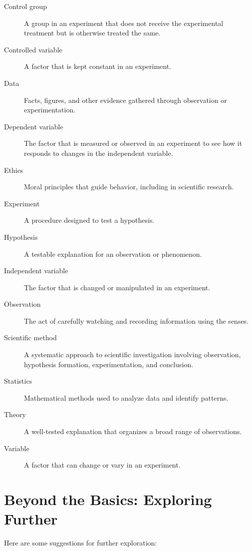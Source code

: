 \begin{description}
    \item[Control group] A group in an experiment that does not receive the experimental treatment but is otherwise treated the same.
    \item[Controlled variable] A factor that is kept constant in an experiment.
    \item[Data] Facts, figures, and other evidence gathered through observation or experimentation.
    \item[Dependent variable] The factor that is measured or observed in an experiment to see how it responds to changes in the independent variable.
    \item[Ethics] Moral principles that guide behavior, including in scientific research.
    \item[Experiment] A procedure designed to test a hypothesis.
    \item[Hypothesis] A testable explanation for an observation or phenomenon.
    \item[Independent variable] The factor that is changed or manipulated in an experiment.
    \item[Observation] The act of carefully watching and recording information using the senses.
    \item[Scientific method] A systematic approach to scientific investigation involving observation, hypothesis formation, experimentation, and conclusion.
    \item[Statistics] Mathematical methods used to analyze data and identify patterns.
    \item[Theory] A well-tested explanation that organizes a broad range of observations.
    \item[Variable] A factor that can change or vary in an experiment.
\end{description}

\section{Beyond the Basics: Exploring Further}

 Here are some suggestions for further exploration:

